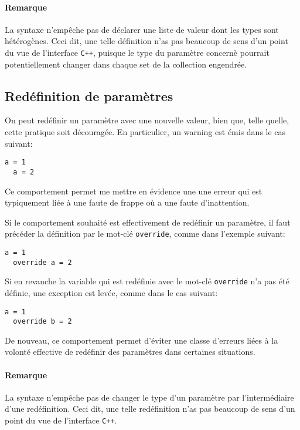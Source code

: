 \paragraph{Remarque} La syntaxe n'emp\^eche pas de d\'eclarer une liste
de valeur dont les types sont h\'et\'erog\`enes. Ceci dit, une
telle d\'efinition n'as pas beaucoup de sens d'un point du vue de
l'interface \texttt{C++}, puisque le type du param\`etre concern\`e
pourrait potentiellement changer dans chaque set de la collection
engendr\'ee.

\subsection{Red\'efinition de param\`etres}
On peut red\'efinir un param\`etre avec une nouvelle valeur, bien que,
telle quelle, cette pratique soit d\'ecourag\'ee. En particulier, un
warning est \'emis dans le cas suivant:
\begin{lstlisting}[language={},frame=single,basicstyle=\ttfamily]
  a = 1
  a = 2
\end{lstlisting}
Ce comportement permet me mettre en \'evidence une une erreur qui est
typiquement li\'ee \`a une faute de frappe o\`u a une faute
d'inattention.

Si le comportement souhait\'e est effectivement de red\'efinir un
param\`etre, il faut pr\'ec\'eder la d\'efinition par le mot-cl\'e
\texttt{override}, comme dans l'exemple suivant:
\begin{lstlisting}[language={},frame=single,basicstyle=\ttfamily]
  a = 1
  override a = 2
\end{lstlisting}
Si en revanche la variable qui est red\'efinie avec le mot-cl\'e
\texttt{override} n'a pas \'et\'e d\'efinie, une exception est
lev\'ee, comme dans le cas suivant:
\begin{lstlisting}[language={},frame=single,basicstyle=\ttfamily]
  a = 1
  override b = 2
\end{lstlisting}
De nouveau, ce comportement permet d'\'eviter une classe d'erreurs
li\'ees \`a la volont\'e effective de red\'efinir des param\`etres
dans certaines situations.
\paragraph{Remarque} La syntaxe n'emp\^eche pas de changer le type d'un
param\`etre par l'interm\'ediaire d'une red\'efinition. Ceci dit, une
telle red\'efinition n'as pas beaucoup de sens d'un point du vue de
l'interface \texttt{C++}.

